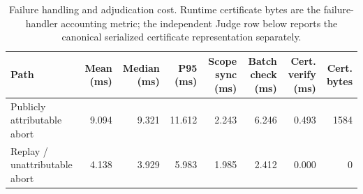 \begin{table}[t]
\centering
\caption{Failure handling and adjudication cost. Runtime certificate bytes are the failure-handler accounting metric; the independent Judge row below reports the canonical serialized certificate representation separately.}
\label{tab:pvia-failure-cost}
\begin{tabular}{lrrrrrrr}
\toprule
Path & Mean (ms) & Median (ms) & P95 (ms) & Scope sync (ms) & Batch check (ms) & Cert. verify (ms) & Cert. bytes \\
\midrule
Publicly attributable abort & 9.094 & 9.321 & 11.612 & 2.243 & 6.246 & 0.493 & 1584 \\
Replay / unattributable abort & 4.138 & 3.929 & 5.983 & 1.985 & 2.412 & 0.000 & 0 \\
\bottomrule
\end{tabular}
\end{table}
